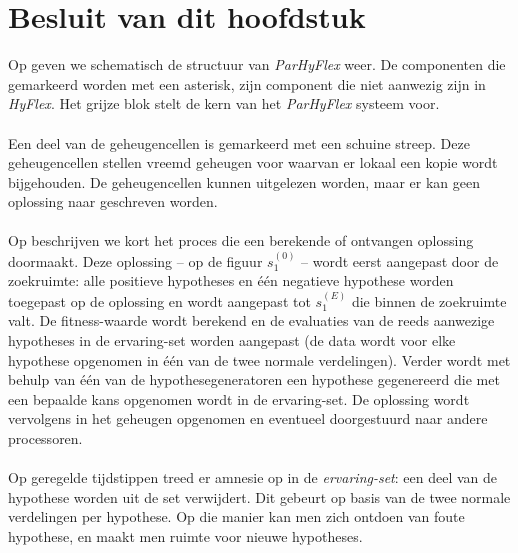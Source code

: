 \section{Besluit van dit hoofdstuk}

Op  geven we schematisch de structuur van \emph{ParHyFlex} weer.	De componenten die gemarkeerd worden met een asterisk, zijn component die niet aanwezig zijn in \emph{HyFlex}. Het grijze blok stelt de kern van het \emph{ParHyFlex} systeem voor.%

\paragraph{}
Een deel van de geheugencellen is gemarkeerd met een schuine streep. Deze geheugencellen stellen vreemd geheugen voor waarvan er lokaal een kopie wordt bijgehouden. De geheugencellen kunnen uitgelezen worden, maar er kan geen oplossing naar geschreven worden.

\paragraph{}
Op  beschrijven we kort het proces die een berekende of ontvangen oplossing doormaakt. Deze oplossing -- op de figuur $s_1^{(0)}$ -- wordt eerst aangepast door de zoekruimte: alle positieve hypotheses en \'e\'en negatieve hypothese worden toegepast op de oplossing en wordt aangepast tot $s_1^{(E)}$ die binnen de zoekruimte valt. De fitness-waarde wordt berekend en de evaluaties van de reeds aanwezige hypotheses in de ervaring-set worden aangepast (de data wordt voor elke hypothese opgenomen in \'e\'en van de twee normale verdelingen). Verder wordt met behulp van \'e\'en van de hypothesegeneratoren  een hypothese gegenereerd die met een bepaalde kans opgenomen wordt in de ervaring-set. De oplossing wordt vervolgens in het geheugen opgenomen en eventueel doorgestuurd naar andere processoren.

\paragraph{}
Op geregelde tijdstippen treed er amnesie op in de \emph{ervaring-set}: een deel van de hypothese worden uit de set verwijdert. Dit gebeurt op basis van de twee normale verdelingen per hypothese. Op die manier kan men zich ontdoen van foute hypothese, en maakt men ruimte voor nieuwe hypotheses.

